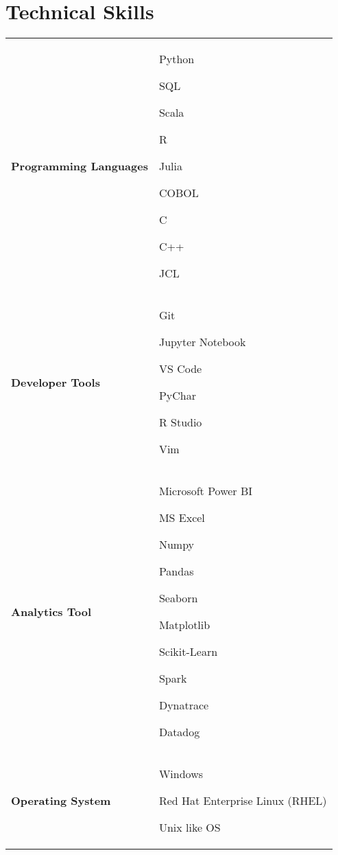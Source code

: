 \documentclass{article}
\begin{document}
	\section*{Technical Skills \hrulefill\vspace{-.3\baselineskip}}
	\begin{tabular}{l p{13.5cm}}
		\textbf{Programming Languages} & 
		\begin{inparaitem}[\hspace{1em}{\tiny\textbullet}]
			\hspace{-1em}\item Python
			\item SQL
			\item Scala
			\item R
			\item Julia
			\item COBOL
			\item C
			\item C++
			\item JCL
		\end{inparaitem} \\
		\textbf{Developer Tools} & 
		\begin{inparaitem}[\hspace{1em}{\tiny\textbullet}]
			\hspace{-1em}\item Git
			\item Jupyter Notebook
			\item VS Code
			\item PyChar
			\item R Studio
			\item Vim
		\end{inparaitem} \\
		\textbf{Analytics Tool} & 
		\begin{inparaitem}[\hspace{1em}{\tiny\textbullet}]
			\hspace{-1em}\item Microsoft Power BI
			\item MS Excel
			\item Numpy
			\item Pandas
			\item Seaborn
			\item Matplotlib
			\item Scikit-Learn
			\item Spark
			\item Dynatrace
			\item Datadog
		\end{inparaitem} \\	
		\textbf{Operating System} & 
		\begin{inparaitem}[\hspace{1em}{\tiny\textbullet}]
			\hspace{-1em}\item Windows
			\item Red Hat Enterprise Linux (RHEL)
			\item Unix like OS
			\end{inparaitem} \\
	\end{tabular}
	
\end{document}
